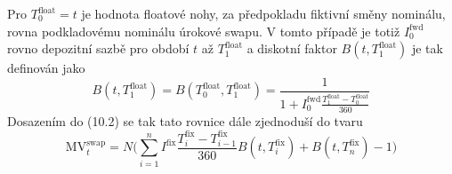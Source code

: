\documentclass[a4paper]{book}
\begin{document}
Pro $T_0^{\mathrm{float}} = t$ je hodnota floatové nohy, za předpokladu fiktivní směny nominálu, rovna podkladovému nominálu úrokové swapu. V tomto případě je totiž $I_0^{\mathrm{fwd}}$ rovno depozitní sazbě pro období $t$ až $T_1^{\mathrm{float}}$ a diskotní faktor $B(t,T_1^{\mathrm{float}})$ je tak definován jako
\begin{equation*}
B(t,T_1^{\mathrm{float}}) = B(T_0^{\mathrm{float}},T_1^{\mathrm{float}}) = \frac{1}{1 + I_0^{\mathrm{fwd}}\frac{T_1^{\mathrm{float}}-T_0^{\mathrm{float}}}{360}}
\end{equation*}
Dosazením do (10.2) se tak tato rovnice dále zjednoduší do tvaru
\begin{equation}
\mathrm{MV}_t^{\mathrm{swap}} = N \Bigg( \sum_{i=1}^n I^{\mathrm{fix}} \frac{T_i^{\mathrm{fix}}-T_{i-1}^{\mathrm{fix}}}{360}B(t,T_i^{\mathrm{fix}}) +  B(t,T_n^{\mathrm{fix}}) - 1\Bigg)
\end{equation}
\\
\end{document}
